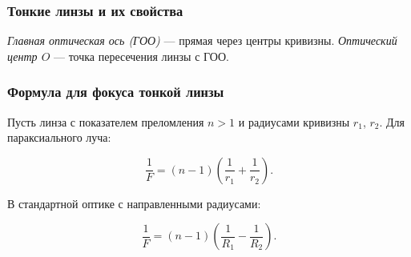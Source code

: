 \documentclass[12pt, a4paper]{article}
\begin{document}
\subsubsection*{Тонкие линзы и их свойства}

\textit{Главная оптическая ось (ГОО)} — прямая через центры кривизны. \textit{Оптический центр $O$} — точка пересечения линзы с ГОО.

\subsubsection*{Формула для фокуса тонкой линзы}

Пусть линза с показателем преломления $n>1$ и радиусами кривизны $r_1$, $r_2$. Для параксиального луча:

\[
\frac{1}{F} = (n-1)\left(\frac{1}{r_1} + \frac{1}{r_2}\right).
\]

В стандартной оптике с направленными радиусами:

\[
\frac{1}{F} = (n-1)\left(\frac{1}{R_1} - \frac{1}{R_2}\right).
\]
\end{document}
